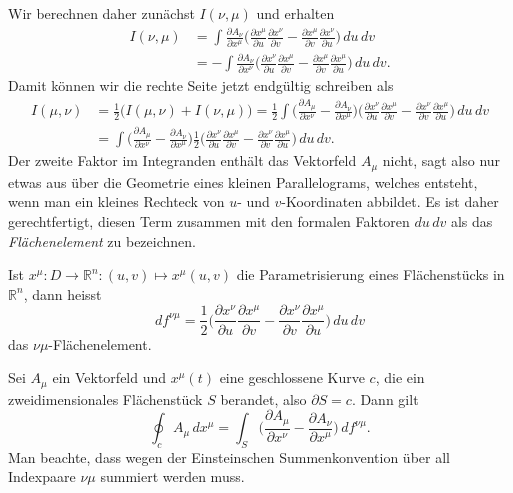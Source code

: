 Wir berechnen daher zunächst $I(\nu,\mu)$ und erhalten
\begin{align*}
I(\nu,\mu)
&=
\int
\frac{\partial A_\nu}{\partial x^\mu}
\biggl(\frac{\partial x^\mu}{\partial u}\frac{\partial x^\nu}{\partial v}
-
\frac{\partial x^\mu}{\partial v}\frac{\partial x^\nu}{\partial u}
\biggr)
\,du\,dv
\\
&=
-
\int
\frac{\partial A_\nu}{\partial x^\nu}
\biggl(\frac{\partial x^\nu}{\partial u}\frac{\partial x^\mu}{\partial v}
-
\frac{\partial x^\mu}{\partial v}\frac{\partial x^\mu}{\partial u}
\biggr)
\,du\,dv.
\end{align*}
Damit können wir die rechte Seite jetzt endgültig schreiben als
\begin{align*}
I(\mu,\nu)
&=
\frac12\biggl( I(\mu,\nu)+I(\nu,\mu)\biggr)
=
\frac12
\int
\biggl(
\frac{\partial A_\mu}{\partial x^\nu}
-
\frac{\partial A_\nu}{\partial x^\mu}
\biggr)
\biggl(
\frac{\partial x^\nu}{\partial u}\frac{\partial x^\mu}{\partial v}
-
\frac{\partial x^\nu}{\partial v}\frac{\partial x^\mu}{\partial u}
\biggr)
\,du\,dv
\\
&=
\int
\biggl(
\frac{\partial A_\mu}{\partial x^\nu}
-
\frac{\partial A_\nu}{\partial x^\mu}
\biggr)
\frac12
\biggl(
\frac{\partial x^\nu}{\partial u}\frac{\partial x^\mu}{\partial v}
-
\frac{\partial x^\nu}{\partial v}\frac{\partial x^\mu}{\partial u}
\biggr)
\,du\,dv.
\end{align*}
Der zweite Faktor im Integranden enthält das Vektorfeld $A_\mu$ nicht,
sagt also nur etwas aus über die Geometrie eines kleinen Parallelograms,
welches entsteht, wenn man ein kleines Rechteck von $u$- und $v$-Koordinaten
abbildet.
Es ist daher gerechtfertigt, diesen Term zusammen mit den formalen
Faktoren $du\,dv$ als das {\em Flächenelement} zu bezeichnen.
\begin{definition}
Ist $x^\mu\colon D\to\mathbb R^n:(u,v)\mapsto x^\mu(u,v)$ die Parametrisierung
eines Flächenstücks in $\mathbb R^n$, dann heisst 
\[
df^{\nu\mu}
=
\frac12
\biggl(
\frac{\partial x^\nu}{\partial u}\frac{\partial x^\mu}{\partial v}
-
\frac{\partial x^\nu}{\partial v}\frac{\partial x^\mu}{\partial u}
\biggr)
\,du\,dv
\]
das $\nu\mu$-Flächenelement.
\end{definition}

\begin{satz}[Stokes]
Sei $A_\mu$ ein Vektorfeld und $x^\mu(t)$ eine geschlossene Kurve $c$,
die ein zweidimensionales Flächenstück $S$ berandet, also $\partial S=c$.
Dann gilt
\[
\oint_c A_\mu\,dx^\mu
=
\int_S \biggl(
\frac{\partial A_\mu}{\partial x^\nu}-\frac{\partial A_\nu}{\partial x^\mu}
\biggr) \,df^{\nu\mu}.
\]
Man beachte, dass wegen der Einsteinschen Summenkonvention über all
Indexpaare $\nu\mu$ summiert werden muss.
\end{satz}

